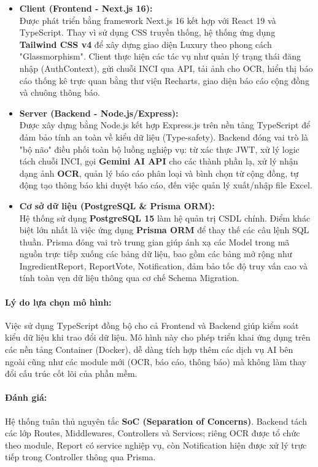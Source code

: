 \documentclass[12pt,a4paper]{article}
\begin{document}
\begin{itemize}
    \item \textbf{Client (Frontend - Next.js 16):} \\
    Được phát triển bằng framework Next.js 16 kết hợp với React 19 và TypeScript. Thay vì sử dụng CSS truyền thống, hệ thống ứng dụng \textbf{Tailwind CSS v4} để xây dựng giao diện Luxury theo phong cách "Glassmorphism". Client thực hiện các tác vụ như quản lý trạng thái đăng nhập (AuthContext), gửi chuỗi INCI qua API, tải ảnh cho OCR, hiển thị báo cáo thống kê trực quan bằng thư viện Recharts, giao diện báo cáo cộng đồng và chuông thông báo.

    \item \textbf{Server (Backend - Node.js/Express):} \\
    Được xây dựng bằng Node.js kết hợp Express.js trên nền tảng TypeScript để đảm bảo tính an toàn về kiểu dữ liệu (Type-safety). Backend đóng vai trò là "bộ não" điều phối toàn bộ luồng nghiệp vụ: từ xác thực JWT, xử lý logic tách chuỗi INCI, gọi \textbf{Gemini AI API} cho các thành phần lạ, xử lý nhận dạng ảnh \textbf{OCR}, quản lý báo cáo phân loại và bình chọn từ cộng đồng, tự động tạo thông báo khi duyệt báo cáo, đến việc quản lý xuất/nhập file Excel.

    \item \textbf{Cơ sở dữ liệu (PostgreSQL \& Prisma ORM):} \\
    Hệ thống sử dụng \textbf{PostgreSQL 15} làm hệ quản trị CSDL chính. Điểm khác biệt lớn nhất là việc ứng dụng \textbf{Prisma ORM} để thay thế các câu lệnh SQL thuần. Prisma đóng vai trò trung gian giúp ánh xạ các Model trong mã nguồn trực tiếp xuống các bảng dữ liệu, bao gồm các bảng mở rộng như IngredientReport, ReportVote, Notification, đảm bảo tốc độ truy vấn cao và tính toàn vẹn dữ liệu thông qua cơ chế Schema Migration.
\end{itemize}

\paragraph{Lý do lựa chọn mô hình:}Việc sử dụng TypeScript đồng bộ cho cả Frontend và Backend giúp kiểm soát kiểu dữ liệu khi trao đổi dữ liệu. Mô hình này cho phép triển khai ứng dụng trên các nền tảng Container (Docker), dễ dàng tích hợp thêm các dịch vụ AI bên ngoài cũng như các module mới (OCR, báo cáo, thông báo) mà không làm thay đổi cấu trúc cốt lõi của phần mềm.

\paragraph{Đánh giá:}Hệ thống tuân thủ nguyên tắc \textbf{SoC (Separation of Concerns)}. Backend tách các lớp Routes, Middlewares, Controllers và Services; riêng OCR được tổ chức theo module, Report có service nghiệp vụ, còn Notification hiện được xử lý trực tiếp trong Controller thông qua Prisma.
\end{document}

